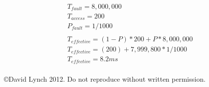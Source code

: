 \documentclass[10pt,a4paper]{article}
\begin{document}
\begin{equation}
\begin{split}
&T_{fault} = 8,000,000 \\
&T_{access} = 200 \\
&P_{fault} = 1/1000 \\
\\
&T_{effective} = (1 - P) * 200 + P * 8,000,000\\
&T_{effective} = (200) + 7,999,800 * 1/1000 \\
&T_{effective} = 8.2ms\\
\end{split}
\end{equation}

{}

\begin{center}
{\small \copyright  David Lynch 2012. Do not reproduce without written permission.}
\end{center}
\end{document}
